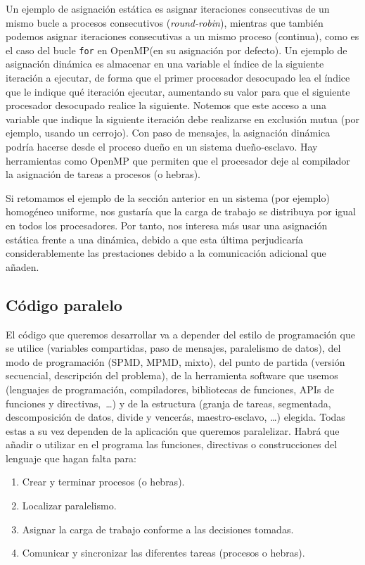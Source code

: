 Un ejemplo de asignación estática es asignar iteraciones consecutivas de un mismo bucle a procesos consecutivos (\textit{round-robin}), mientras que también podemos asignar iteraciones consecutivas a un mismo proceso (continua), como es el caso del bucle \verb|for| en OpenMP\@ (en su asignación por defecto). Un ejemplo de asignación dinámica es almacenar en una variable el índice de la siguiente iteración a ejecutar, de forma que el primer procesador desocupado lea el índice que le indique qué iteración ejecutar, aumentando su valor para que el siguiente procesador desocupado realice la siguiente. Notemos que este acceso a una variable que indique la siguiente iteración debe realizarse en exclusión mutua (por ejemplo, usando un cerrojo). Con paso de mensajes, la asignación dinámica podría hacerse desde el proceso dueño en un sistema dueño-esclavo. Hay herramientas como OpenMP que permiten que el procesador deje al compilador la asignación de tareas a procesos (o hebras).

\begin{ejemplo}
    Si retomamos el ejemplo de la sección anterior en un sistema (por ejemplo) homogéneo uniforme, nos gustaría que la carga de trabajo se distribuya por igual en todos los procesadores. Por tanto, nos interesa más usar una asignación estática frente a una dinámica, debido a que esta última perjudicaría considerablemente las prestaciones debido a la comunicación adicional que añaden.
\end{ejemplo}
\subsection{Código paralelo}
El código que queremos desarrollar va a depender del estilo de programación que se utilice (variables compartidas, paso de mensajes, paralelismo de datos), del modo de programación (SPMD, MPMD, mixto), del punto de partida (versión secuencial, descripción del problema), de la herramienta software que usemos (lenguajes de programación, compiladores, bibliotecas de funciones, APIs de funciones y directivas,~\ldots) y de la estructura (granja de tareas, segmentada, descomposición de datos, divide y vencerás, maestro-esclavo, \ldots) elegida. Todas estas a su vez dependen de la aplicación que queremos paralelizar.
Habrá que añadir o utilizar en el programa las funciones, directivas o construcciones del lenguaje que hagan falta para:
\begin{enumerate}
    \item Crear y terminar procesos (o hebras).
    \item Localizar paralelismo.
    \item Asignar la carga de trabajo conforme a las decisiones tomadas.
    \item Comunicar y sincronizar las diferentes tareas (procesos o hebras).
\end{enumerate}

